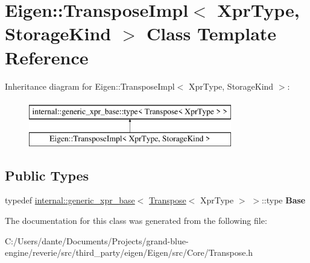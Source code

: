 \hypertarget{class_eigen_1_1_transpose_impl}{}\section{Eigen\+::Transpose\+Impl$<$ Xpr\+Type, Storage\+Kind $>$ Class Template Reference}
\label{class_eigen_1_1_transpose_impl}
Inheritance diagram for Eigen\+::Transpose\+Impl$<$ Xpr\+Type, Storage\+Kind $>$\+:\begin{figure}[H]
\begin{center}
\leavevmode
\includegraphics[height=2.000000cm]{class_eigen_1_1_transpose_impl}
\end{center}
\end{figure}
\subsection*{Public Types}
\begin{DoxyCompactItemize}
\item 
\mbox{\label{class_eigen_1_1_transpose_impl_ab0b1fd7b1095810ccaa0dd7ffb31e6ba}} 
typedef \mbox{\hyperlink{struct_eigen_1_1internal_1_1generic__xpr__base}{internal\+::generic\+\_\+xpr\+\_\+base}}$<$ \mbox{\hyperlink{class_eigen_1_1_transpose}{Transpose}}$<$ Xpr\+Type $>$ $>$\+::type {\bfseries Base}
\end{DoxyCompactItemize}


The documentation for this class was generated from the following file\+:\begin{DoxyCompactItemize}
\item 
C\+:/\+Users/dante/\+Documents/\+Projects/grand-\/blue-\/engine/reverie/src/third\+\_\+party/eigen/\+Eigen/src/\+Core/Transpose.\+h\end{DoxyCompactItemize}
